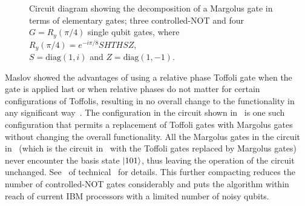 \begin{figure}[h]
	\centering
	\caption[Circuit diagram showing the decomposition of a Margolus gate]{Circuit diagram showing the decomposition of a Margolus gate in terms of elementary gates; three controlled-NOT and four ${G = R_y(\pi/4)}$ single qubit gates, where ${R_y(\pi/4) = e^{-i \pi / 8} S H T H S Z}$,\\ ${S=\mathrm{diag}(1, i)}$ and ${Z=\mathrm{diag}(1,-1)}$.}
\end{figure}

\bigskip
\noindent
Maslov showed the advantages of using a relative phase Toffoli gate when the gate is applied last or when relative phases do not matter for certain configurations of Toffolis, resulting in no overall change to the functionality in any significant way~\cite{Maslov_2016}. The configuration in the circuit shown in~ is one such configuration that permits a replacement of Toffoli gates with Margolus gates without changing the overall functionality. All the Margolus gates in the circuit in~ (which is the circuit in~ with the Toffoli gates replaced by Margolus gates) never encounter the basis state $\ket{101}$, thus leaving the operation of the circuit unchanged. See~ of technical~ for details. This further compacting reduces the number of controlled-NOT gates considerably and puts the algorithm within reach of current IBM processors with a limited number of noisy qubits.

